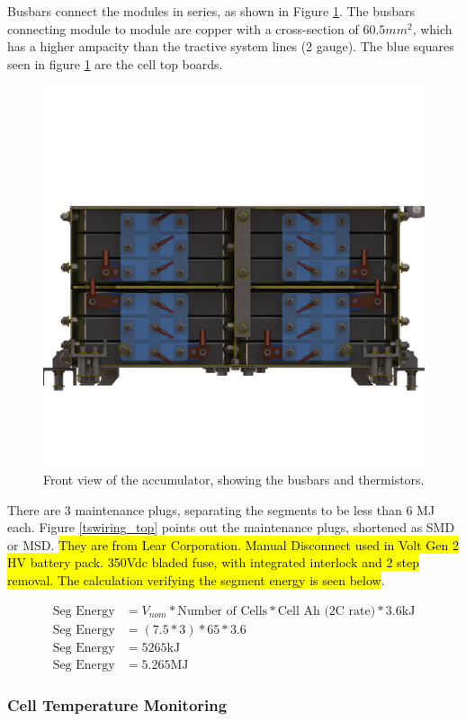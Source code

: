\documentclass{article}
\DeclareRobustCommand{\hlr}[1]{{\sethlcolor{red}\hl{#1}}}
\begin{document}
            Busbars connect the modules in series, as shown in Figure \ref{busbar}. The busbars connecting module to module are copper with a cross-section of $60.5 mm^2$, which has a higher ampacity than the tractive system lines (2 gauge). The blue squares seen in figure \ref{busbar} are the cell top boards.

            \begin{figure}[H]
                \centering
                \includegraphics[width = 0.6 \textwidth]{bus-bar_configuration}
                \caption{Front view of the accumulator, showing the busbars and thermistors. }
                \label{busbar}
            \end{figure}

            There are 3 maintenance plugs, separating the segments to be less than 6 MJ each. Figure \ref{tswiring_top} points out the maintenance plugs, shortened as SMD or MSD. \hlr{They are from Lear Corporation. Manual Disconnect used in Volt Gen 2 HV battery pack. 350Vdc bladed fuse, with integrated interlock and 2 step removal. The calculation verifying the segment energy is seen below}.

            \begin{align}
              \text{Seg Energy} &= V_{nom}  * \text{Number of Cells} * \text{Cell Ah (2C rate)} *  3.6 \text{kJ}\\
              \text{Seg Energy} &= (7.5*3 ) * 65 * 3.6 \\
              \text{Seg Energy} &= 5265 \text{kJ}\\
              \text{Seg Energy} &= 5.265 \text{MJ}
            \end{align}

        \subsubsection{Cell Temperature Monitoring} %
\end{document}
